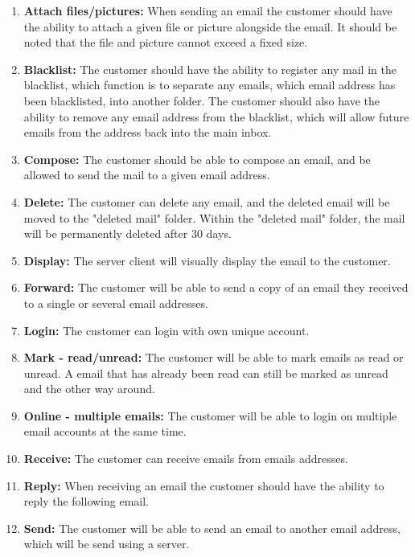 \documentclass{article}
\begin{document}
\begin{enumerate}
    \item \textbf{Attach files/pictures:} When sending an email the customer should have the ability to attach a given file or picture alongside the email. It should be noted that the file and picture cannot exceed a fixed size. 
    \item \textbf{Blacklist:} The customer should have the ability to register any mail in the blacklist, which function is to separate any emails, which email address has been blacklisted, into another folder. The customer should also have the ability to remove any email address from the blacklist, which will allow future emails from the address back into the main inbox.
    \item \textbf{Compose:} The customer should be able to compose an email, and be allowed to send the mail to a given email address.
    \item \textbf{Delete:} The customer can delete any email, and the deleted email will be moved to the "deleted mail" folder. Within the "deleted mail" folder, the mail will be permanently deleted after 30 days.
    \item \textbf{Display:} The server client will visually display the email to the customer. 
    \item \textbf{Forward:} The customer will be able to send a copy of an email they received to a single or several email addresses. 
    \item \textbf{Login:} The customer can login with own unique account.
    \item \textbf{Mark - read/unread:} The customer will be able to mark emails as read or unread. A email that has already been read can still be marked as unread and the other way around.
    \item \textbf{Online - multiple emails:} The customer will be able to login on multiple email accounts at the same time. 
    \item \textbf{Receive:} The customer can receive emails from emails addresses. 
    \item \textbf{Reply:} When receiving an email the customer should have the ability to reply the following email.
    \item \textbf{Send:} The customer will be able to send an email to another email address, which will be send using a server.
\end{enumerate}
\end{document}

